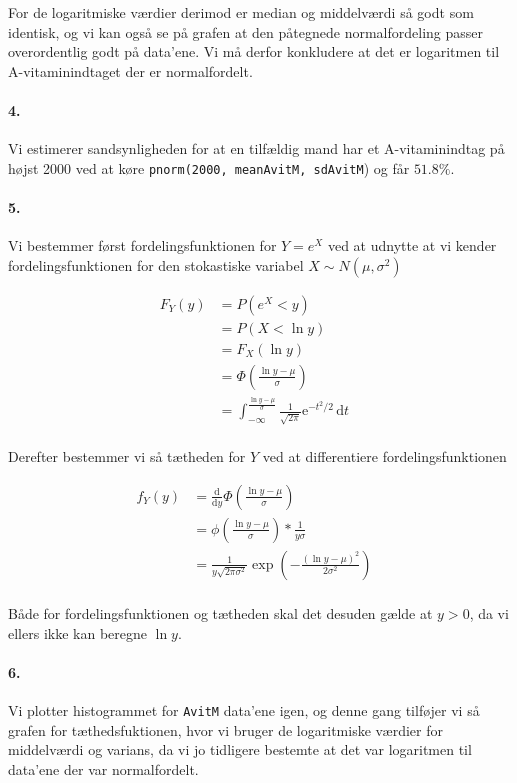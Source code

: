 \documentclass[12pt]{article}
\begin{document}
For de logaritmiske værdier derimod er median og middelværdi så godt som identisk, og vi kan også se på grafen at den påtegnede normalfordeling passer overordentlig godt på data'ene. Vi må derfor konkludere at det er logaritmen til A-vitaminindtaget der er normalfordelt.

\paragraph{4.}
Vi estimerer sandsynligheden for at en tilfældig mand har et A-vitaminindtag på højst 2000 ved at køre \verb!pnorm(2000, meanAvitM, sdAvitM!) og får $51.8\%$.

\paragraph{5.}
Vi bestemmer først fordelingsfunktionen for $Y = e^X$ ved at udnytte at vi kender fordelingsfunktionen for den stokastiske variabel $X \sim N(\mu, \sigma^2)$

\begin{align*}
  F_Y(y) &= P(e^X < y) &\\
  &= P(X < \ln y) &\\
  &= F_X(\ln y) &\\
  &= \Phi \left( \frac{\ln{y} - \mu}{\sigma} \right) &\\
  &= \int_{-\infty}^{\frac{\ln{y}-\mu}{\sigma}} \frac{1}{\sqrt{2\pi}} \mathrm{e}^{-t^2/2}\,\mathrm{d}t &\\
\end{align*}

Derefter bestemmer vi så tætheden for $Y$ ved at differentiere fordelingsfunktionen

\begin{align*}
  f_Y(y) &= \frac{\mathrm{d}}{\mathrm{d}y} \Phi \left( \frac{\ln{y} - \mu}{\sigma} \right) &\\
         &= \phi \left( \frac{\ln{y} - \mu}{\sigma} \right) * \frac{1}{y\sigma} &\\
         &= \frac{1}{y\sqrt{2\pi\sigma^2}} \exp \left(-\frac{(\ln{y} - \mu)^2}{2\sigma^2} \right) &\\
\end{align*}

Både for fordelingsfunktionen og tætheden skal det desuden gælde at $y > 0$, da vi ellers ikke kan beregne $\ln{y}$.

\paragraph{6.}
Vi plotter histogrammet for \verb!AvitM! data'ene igen, og denne gang tilføjer vi så grafen for tæthedsfuktionen, hvor vi bruger de logaritmiske værdier for middelværdi og varians, da vi jo tidligere bestemte at det var logaritmen til data'ene der var normalfordelt.
\end{document}
